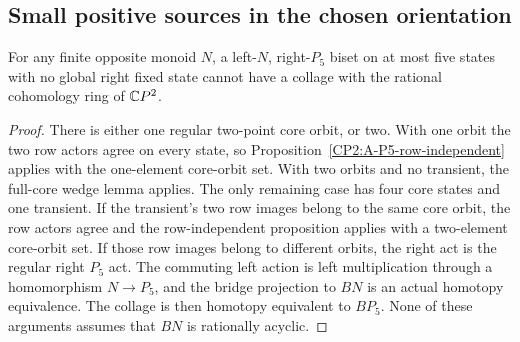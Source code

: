 \subsection{Small positive sources in the chosen orientation}

\begin{lemma}
\label{CP2:A-P5-oriented-five}
For any finite opposite monoid $N$, a left-$N$,
right-$P_5$ biset on at most five states with no global
right fixed state cannot have a collage with the rational
cohomology ring of $\mathbb{C}P^2$.
\end{lemma}
\begin{proof}
There is either one regular two-point core orbit, or two.
With one orbit the two row actors agree on every state,
so Proposition~\ref{CP2:A-P5-row-independent} applies with
the one-element core-orbit set. With two orbits and no
transient, the full-core wedge lemma applies. The only
remaining case has four core states and one transient.
If the transient's two row images belong to the same
core orbit, the row actors agree and the row-independent
proposition applies with a two-element core-orbit set.
If those row images belong to different orbits, the right
act is the regular right $P_5$ act. The commuting left
action is left multiplication through a homomorphism
$N\to P_5$, and the bridge projection to $BN$ is an actual
homotopy equivalence. The collage is then homotopy
equivalent to $BP_5$. None of these arguments assumes
that $BN$ is rationally acyclic.
\end{proof}

